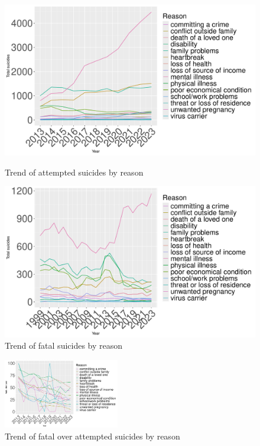 \documentclass{article}
\begin{document}
\begin{figure}[H]
    \centering
    \begin{minipage}{0.45\textwidth}
        \includegraphics[width=\textwidth]{imgs/reason_attempted.pdf}
        \caption{Trend of attempted suicides by reason }
	\label{reason_attempted}
    \end{minipage}
    \hfill
    \begin{minipage}{0.45\textwidth}
        \includegraphics[width=\textwidth]{imgs/reason_fatal.pdf}
        \caption{Trend of fatal suicides by reason }
	\label{reason_fatal}
    \end{minipage}
\end{figure}

\begin{figure}[H]
    \centering
    \includegraphics[width=0.45\textwidth]{imgs/reason_foa.pdf}
    \caption{Trend of fatal over attempted suicides by reason }
    \label{reason_foa}
\end{figure}
\end{document}
